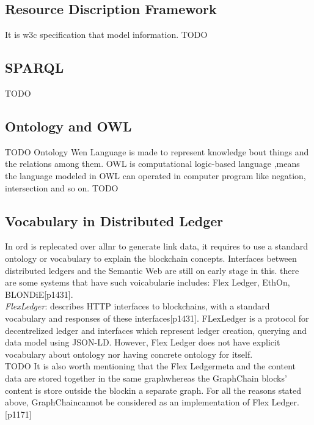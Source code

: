 \subsection{Resource Discription Framework}
It is w3c specification that model information.
TODO
\subsection{SPARQL}
TODO
\subsection{Ontology and OWL}
TODO
Ontology Wen Language is made to represent knowledge bout things and the relations among them. OWL is computational logic-based language ,means the language modeled in OWL can operated in computer program like negation, intersection and so on. TODO

 \subsection{Vocabulary in Distributed Ledger}
 In ord is replecated over allnr to generate link data, it requires to use a standard ontology or vocabulary to explain the blockchain concepts. Interfaces between distributed ledgers and the Semantic Web are still on early stage in this. there are some systems that have such voicabularie includes: Flex Ledger, EthOn, BLONDiE[p1431].\\
 
 \textit{FlexLedger}: describes HTTP interfaces to blockchains, with a standard vocabulary and responses of these interfaces[p1431]. FLexLedger is a protocol for decentrelized ledger and interfaces which represent ledger creation, querying and data model using JSON-LD. However, Flex Ledger does not have explicit vocabulary about ontology nor  having concrete ontology for itself. 
 \\TODO It is also worth mentioning that the Flex Ledgermeta and the content data are stored together in the same graphwhereas the GraphChain blocks’ content is store outside the blockin a separate graph. For all the reasons stated above, GraphChaincannot be considered as an implementation of Flex Ledger.[p1171]\\
 \\
 \\
 \\
 \\
 
